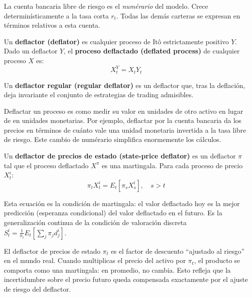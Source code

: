\documentclass[12pt]{article}
\begin{document}
\begin{intuicionmat}
La cuenta bancaria libre de riesgo es el \textit{num\'erario} del modelo. Crece determin\'isticamente a la tasa corta $r_t$. Todas las dem\'as carteras se expresan en t\'erminos relativos a esta cuenta.
\end{intuicionmat}

Un \textbf{deflactor (deflator)} es cualquier proceso de It\^o estrictamente positivo $Y$. Dado un deflactor $Y$, el \textbf{proceso deflactado (deflated process)} de cualquier proceso $X$ es:
\begin{equation}
  X_t^Y = X_t Y_t
\end{equation}

Un \textbf{deflactor regular (regular deflator)} es un deflactor que, tras la deflaci\'on, deja invariante el conjunto de estrategias de trading admisibles.

\begin{intuicion}
Deflactar un proceso es como medir su valor en unidades de otro activo en lugar de en unidades monetarias. Por ejemplo, deflactar por la cuenta bancaria da los precios en t\'erminos de cu\'anto vale una unidad monetaria invertida a la tasa libre de riesgo. Este cambio de num\'erario simplifica enormemente los c\'alculos.
\end{intuicion}

Un \textbf{deflactor de precios de estado (state-price deflator)} es un deflactor $\pi$ tal que el proceso deflactado $X^\pi$ es una martingala. Para cada proceso de precio $X_t^i$:
\begin{equation}
  \pi_t X_t^i = E_t[\pi_s X_s^i], \quad s > t
\end{equation}

\begin{intuicionmat}
Esta ecuaci\'on es la condici\'on de martingala: el valor deflactado hoy es la mejor predicci\'on (esperanza condicional) del valor deflactado en el futuro. Es la generalizaci\'on continua de la condici\'on de valoraci\'on discreta $S_t^i = \frac{1}{\pi_t}E_t\!\left[\sum_j \pi_j d_j^i\right]$.
\end{intuicionmat}

\begin{intuicion}
El deflactor de precios de estado $\pi_t$ es el factor de descuento ``ajustado al riesgo'' en el mundo real. Cuando multiplicas el precio del activo por $\pi_t$, el producto se comporta como una martingala: en promedio, no cambia. Esto refleja que la incertidumbre sobre el precio futuro queda compensada exactamente por el ajuste de riesgo del deflactor.
\end{intuicion}
\end{document}
